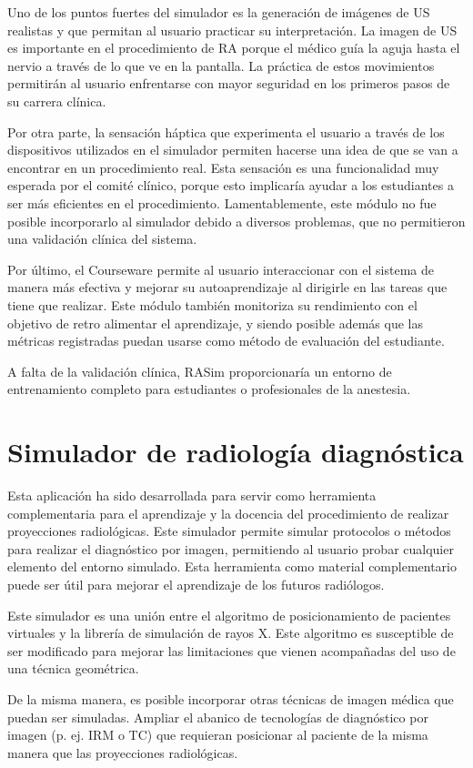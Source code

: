 Uno de los puntos fuertes del simulador es la generación de imágenes de \ac{US} realistas y que permitan al usuario practicar su interpretación. La imagen de \ac{US} es importante en el procedimiento de \ac{RA} porque el médico guía la aguja hasta el nervio a través de lo que ve en la pantalla. La práctica de estos movimientos permitirán al usuario enfrentarse con mayor seguridad en los primeros pasos de su carrera clínica. 

Por otra parte, la sensación háptica que experimenta el usuario a través de los dispositivos utilizados en el simulador permiten hacerse una idea de que se van a encontrar en un procedimiento real. Esta sensación es una funcionalidad muy esperada por el comité clínico, porque esto implicaría ayudar a los estudiantes a ser más eficientes en el procedimiento. Lamentablemente, este módulo no fue posible incorporarlo al simulador debido a diversos problemas, que no permitieron una validación clínica del sistema.


Por último, el \ac{Courseware} permite al usuario interaccionar con el sistema de manera más efectiva y mejorar su autoaprendizaje al dirigirle en las tareas que tiene que realizar. Este módulo también monitoriza su rendimiento con el objetivo de retro alimentar el aprendizaje, y siendo posible además que las métricas registradas puedan usarse como método de evaluación del estudiante.

A falta de la validación clínica, \ac{RASim} proporcionaría un entorno de entrenamiento completo para estudiantes o profesionales de la anestesia. 




\section{Simulador de radiología diagnóstica }
\label{conclu:xray}
Esta aplicación ha sido desarrollada para servir como herramienta complementaria para el aprendizaje y la docencia del procedimiento de realizar proyecciones radiológicas. Este simulador permite simular protocolos o métodos para realizar el diagnóstico por imagen, permitiendo al usuario probar cualquier elemento del entorno simulado. Esta herramienta como material complementario puede ser útil para mejorar el aprendizaje de los futuros radiólogos.

Este simulador es una unión entre el algoritmo de posicionamiento de pacientes virtuales y la librería de simulación de rayos X. Este algoritmo es susceptible de ser modificado para mejorar las limitaciones que vienen acompañadas del uso de una técnica geométrica.  

De la misma manera, es posible incorporar otras técnicas de imagen médica que puedan ser simuladas. Ampliar el abanico de tecnologías de diagnóstico por imagen (p. ej. \ac{IRM} o \ac{TC}) que requieran posicionar al paciente de la misma manera que las proyecciones radiológicas. 





